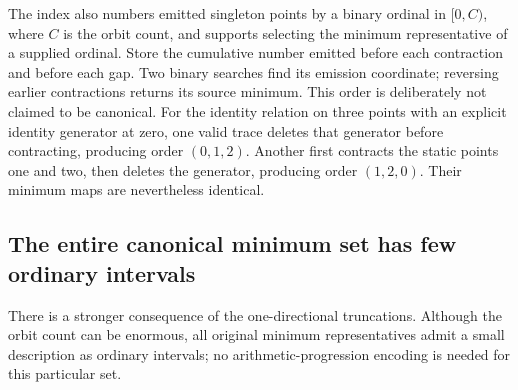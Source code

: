 The index also numbers emitted singleton points by a binary ordinal in
$[0,C)$, where $C$ is the orbit count, and supports selecting the minimum
representative of a supplied ordinal.  Store the cumulative number emitted
before each contraction and before each gap.  Two binary searches find its
emission coordinate; reversing earlier contractions returns its source
minimum.  This order is deliberately not claimed to be canonical.  For the
identity relation on three points with an explicit identity generator at
zero, one valid trace deletes that generator before contracting, producing
order $(0,1,2)$.  Another first contracts the static points one and two,
then deletes the generator, producing order $(1,2,0)$.  Their minimum maps
are nevertheless identical.

\subsection{The entire canonical minimum set has few ordinary intervals}

There is a stronger consequence of the one-directional truncations.
Although the orbit count can be enormous, all original minimum
representatives admit a small description as ordinary intervals; no
arithmetic-progression encoding is needed for this particular set.

